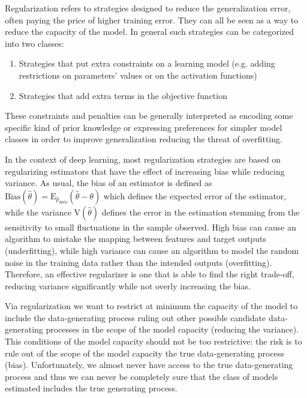 Regularization refers to strategies designed to reduce the generalization error, often paying the price of higher training error. They can all be seen as a way to reduce the capacity of the model. In general such strategies can be categorized into two classes: 
\begin{enumerate}
    \item Strategies that put extra constraints on a learning model  (e.g. adding restrictions on parameters' values or on the activation functions)
    \item Strategies that add extra terms in the objective function
\end{enumerate}
These constraints and penalties can be generally interpreted as encoding some specific kind of prior knowledge or expressing preferences for simpler model classes in order to improve generalization reducing the threat of overfitting.

In the context of deep learning, most regularization strategies are based on regularizing estimators that have the effect of increasing bias while reducing variance. As usual, the bias of an estimator is defined as $\text{Bias}(\hat{\theta}) = \mathrm{E}_{\hat{p}_{data}}(\hat{\theta} - \theta)$ which defines the expected error of the estimator, while the variance $\mathrm{V}(\hat{\theta})$ defines the error in the estimation stemming from the sensitivity to small fluctuations in the sample observed. High bias can cause an algorithm to mistake the mapping between features and target outputs (underfitting), while high variance can cause an algorithm to model the random noise in the training data rather than the intended outputs (overfitting). Therefore, an effective regularizer is one that is able to find the right trade-off, reducing variance significantly while not overly increasing the bias. 

Via regularization we want to restrict at minimum the capacity of the model to include the data-generating process ruling out other possible candidate data-generating processes in the scope of the model capacity (reducing the variance). This conditions of the model capacity should not be too restrictive: the risk is to rule out of the scope of the model capacity the true data-generating process (bias). Unfortunately, we almost never have access to the true data-generating process and thus we can never be completely sure that the class of models estimated includes the true generating process. 




